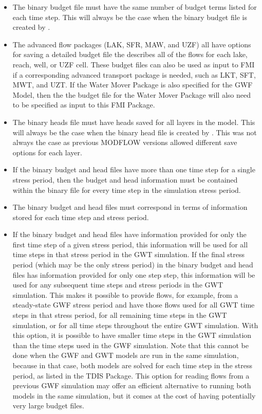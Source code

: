 \begin{itemize}
\begin{itemize}
\item The binary budget file must have the same number of budget terms listed for each time step.  This will always be the case when the binary budget file is created by \mf.
\item The advanced flow packages (LAK, SFR, MAW, and UZF) all have options for saving a detailed budget file the describes all of the flows for each lake, reach, well, or UZF cell.  These budget files can also be used as input to FMI if a corresponding advanced transport package is needed, such as LKT, SFT, MWT, and UZT.  If the Water Mover Package is also specified for the GWF Model, then the the budget file for the Water Mover Package will also need to be specified as input to this FMI Package.
\item The binary heads file must have heads saved for all layers in the model.  This will always be the case when the binary head file is created by \mf.  This was not always the case as previous MODFLOW versions allowed different save options for each layer.
\item If the binary budget and head files have more than one time step for a single stress period, then the budget and head information must be contained within the binary file for every time step in the simulation stress period.
\item The binary budget and head files must correspond in terms of information stored for each time step and stress period.
\item If the binary budget and head files have information provided for only the first time step of a given stress period, this information will be used for all time steps in that stress period in the GWT simulation. If the final stress period (which may be the only stress period) in the binary budget and head files has information provided for only one step step, this information will be used for any subsequent time steps and stress periods in the GWT simulation. This makes it possible to provide flows, for example, from a steady-state GWF stress period and have those flows used for all GWT time steps in that stress period, for all remaining time steps in the GWT simulation, or for all time steps throughout the entire GWT simulation. With this option, it is possible to have smaller time steps in the GWT simulation than the time steps used in the GWF simulation. Note that this cannot be done when the GWF and GWT models are run in the same simulation, because in that case, both models are solved for each time step in the stress period, as listed in the TDIS Package. This option for reading flows from a previous GWF simulation may offer an efficient alternative to running both models in the same simulation, but it comes at the cost of having potentially very large budget files.
\end{itemize}

\end{itemize}

